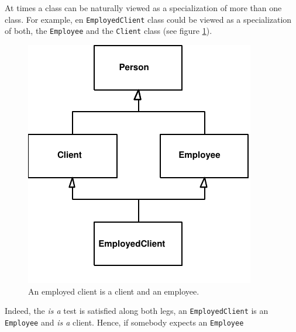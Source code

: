 At times a class can be naturally viewed as a specialization of more
than one class. For example, en \verb+EmployedClient+ class could be 
viewed as a specialization of both, the \verb+Employee+ and the 
\verb+Client+ class (see figure \ref{figEmployedClient}). 


  \begin{figure}[htb]
    \begin{center}  
      \includegraphics{Abstraction/EmployedClient.pdf}
    \end{center}  
    \caption{An employed client is a client and an employee.
             \label{figEmployedClient}} 
  \end{figure}

Indeed, the {\em is a} test is satisfied along 
both legs, an \verb+EmployedClient+ is an \verb+Employee+ and 
{\em is a} client. Hence, if somebody expects an \verb+Employee+


